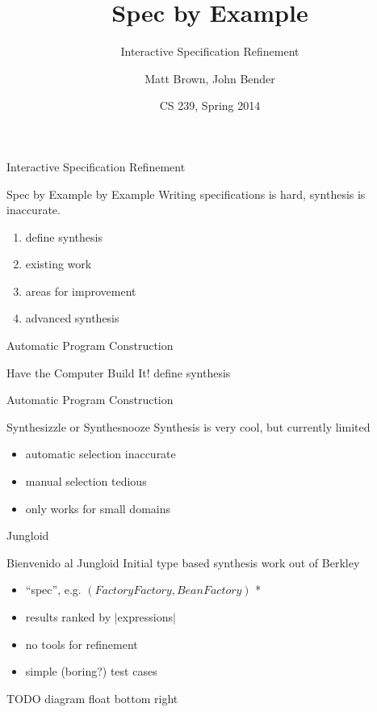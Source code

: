 \documentclass{beamer}
\title{Spec by Example}
\subtitle{Interactive Specification Refinement}
\author{Matt Brown, John Bender}
\date{CS 239, Spring 2014}
\begin{document}
\setlength{\abovedisplayskip}{0pt}
\setlength{\belowdisplayskip}{0pt}
\setlength{\abovedisplayshortskip}{0pt}
\setlength{\belowdisplayshortskip}{0pt}

\begin{frame}
  \titlepage
\end{frame}

\begin{frame}{Interactive Specification Refinement}
  \begin{block}{Spec by Example by Example}
    Writing specifications is hard, synthesis is inaccurate.

    \begin{enumerate}
      \item define synthesis
      \item existing work
      \item areas for improvement
      \item advanced synthesis
    \end{enumerate}
  \end{block}
\end{frame}

\begin{frame}{Automatic Program Construction}
  \begin{block}{Have the Computer Build It!}
    define synthesis
  \end{block}
\end{frame}

\begin{frame}{Automatic Program Construction}
  \begin{block}{Synthesizzle or Synthesnooze}
    Synthesis is very cool, but currently limited

    \begin{itemize}
      \item automatic selection inaccurate
      \item manual selection tedious
      \item only works for small domains
    \end{itemize}
  \end{block}
\end{frame}

\begin{frame}{Jungloid}
  \begin{block}{Bienvenido al Jungloid}
    Initial type based synthesis work out of Berkley

    \begin{itemize}
      \item ``spec'', e.g. $(FactoryFactory, BeanFactory)$ *
      \item results ranked by $|$expressions$|$
      \item no tools for refinement
      \item simple (boring?) test cases
    \end{itemize}

    TODO diagram float bottom right
  \end{block}
\end{frame}
\end{document}
